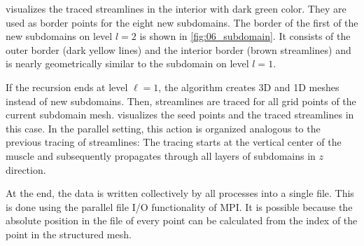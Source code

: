  visualizes the traced streamlines in the interior with dark green color. They are used as border points for the eight new subdomains. The border of the first of the new subdomains on level $l=2$ is shown in \cref{fig:06_subdomain}. It consists of the outer border (dark yellow lines) and the interior border (brown streamlines) and is nearly geometrically similar to the subdomain on level $l=1$. 

If the recursion ends at level $\ell=1$, the algorithm creates 3D and 1D meshes instead of new subdomains. Then, streamlines are traced for all grid points of the current subdomain mesh.  visualizes the seed points and the traced streamlines in this case. In the parallel setting, this action is organized analogous to the previous tracing of streamlines: The tracing starts at the vertical center of the muscle and subsequently propagates through all layers of subdomains in $z$ direction. 

At the end, the data is written collectively by all processes into a single file. This is done using the parallel file I/O functionality of MPI. It is possible because the absolute position in the file of every point can be calculated from the index of the point in the structured mesh.



